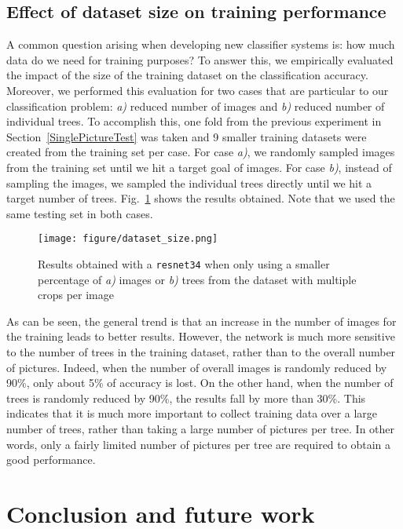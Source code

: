 \documentclass[letterpaper, 10 pt, conference]{ieeeconf}  %
\begin{document}
\subsection{Effect of dataset size on training performance}

A common question arising when developing new classifier systems is: how much data do we need for training purposes? To answer this, we empirically evaluated the impact of the size of the training dataset on the classification accuracy. Moreover, we performed this evaluation for two cases that are particular to our classification problem: \emph{a)} reduced number of images and \emph{b)} reduced number of individual trees. To accomplish this, one fold from the previous experiment in Section~\ref{SinglePictureTest} was taken and 9 smaller training datasets were created from the training set per case. For case \emph{a)}, we randomly sampled images from the training set until we hit a target goal of images. For case \emph{b)}, instead of sampling the images, we sampled the individual trees directly until we hit a target number of trees. Fig.~\ref{fig:dataset_size} shows the results obtained. Note that we used the same testing set in both cases.

\begin{figure}[t] %
\centering
\texttt{[image: figure/dataset\_size.png]}
\caption{Results obtained with a \texttt{resnet34} when only using a smaller percentage of \emph{a)} images or \emph{b)} trees from the dataset with multiple crops per image}
\label{fig:dataset_size}
\end{figure}

As can be seen, the general trend is that an increase in the number of images for the training leads to better results. However, the network is much more sensitive to the number of trees in the training dataset, rather than to the overall number of pictures. Indeed, when the number of overall images is randomly reduced by 90\%, only about 5\%
of accuracy is lost. On the other hand, when the number of trees is randomly reduced by 90\%, the results fall by more than 30\%. This indicates that it is much more important to collect training data over a large number of trees, rather than taking a large number of pictures per tree. In other words, only a fairly limited number of pictures per tree are required to obtain a good performance.

\section{Conclusion and future work} \label{sec:conclusion}
\end{document}
